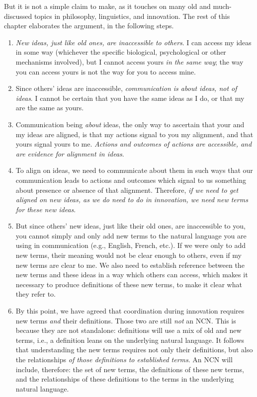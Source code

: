\documentclass[graybox,envcountchap,sectrefs]{svmono}
\newcommand{\ncn}{NCN}
\begin{document}
But it is not a simple claim to make, as it touches on many old and much-discussed topics in philosophy, linguistics, and innovation. The rest of this chapter elaborates the argument, in the following steps.
\begin{enumerate}
	\item \textit{New ideas, just like old ones, are inaccessible to others}. I can access my ideas in some way (whichever the specific biological, psychological or other mechanisms involved), but I cannot access yours \textit{in the same way}; the way you can access yours is not the way for you to access mine.
	\item Since others' ideas are inaccessible, \textit{communication is about ideas, not of ideas}. I cannot be certain that you have the same ideas as I do, or that my are the same as yours.
	\item Communication being \textit{about} ideas, the only way to ascertain that your and my ideas are aligned, is that my actions signal to you my alignment, and that yours signal yours to me. \textit{Actions and outcomes of actions are accessible, and are evidence for alignment in ideas}.
	\item To align on ideas, we need to communicate about them in such ways that our communication leads to actions and outcomes which signal to us something about presence or absence of that alignment. Therefore, \textit{if we need to get aligned on new ideas, as we do need to do in innovation, we need new terms for these new ideas}.
	\item But since others' new ideas, just like their old ones, are inaccessible to you, you cannot simply and only add new terms to the natural language you are using in communication (e.g., English, French, etc.). If we were only to add new terms, their meaning would not be clear enough to others, even if my new terms are clear to me. We also need to establish reference between the new terms and these ideas in a way which others can access, which makes it necessary to produce definitions of these new terms, to make it clear what they refer to.
	\item By this point, we have agreed that coordination during innovation requires new terms \textit{and} their definitions. Those two are still \textit{not} an \ncn. This is because they are not standalone: definitions will use a mix of old and new terms, i.e., a definition leans on the underlying natural language. It follows that understanding the new terms requires not only their definitions, but also the relationships \textit{of those definitions to established terms}. An \ncn{} will include, therefore: the set of new terms, the definitions of these new terms, and the relationships of these definitions to the terms in the underlying natural language.

\end{enumerate}
\end{document}
